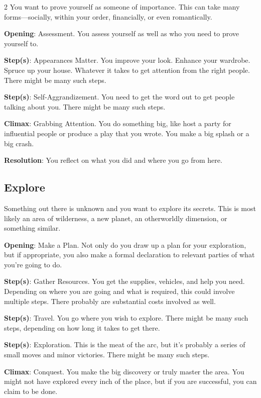 \begin{multicols}{2}
You want to prove yourself as someone of importance. This can take many forms—socially, within your order, financially, or even romantically.

\textbf{Opening}: Assessment. You assess yourself as well as who you need to prove yourself to.

\textbf{Step(s)}: Appearances Matter. You improve your look. Enhance your wardrobe. Spruce up your house. Whatever it takes to get attention from the right people. There might be many such steps.

\textbf{Step(s)}: Self-Aggrandizement. You need to get the word out to get people talking about you. There might be many such steps.

\textbf{Climax}: Grabbing Attention. You do something big, like host a party for influential people or produce a play that you wrote. You make a big splash or a big crash. 

\textbf{Resolution}: You reflect on what you did and where you go from here.

\subsection{Explore}

Something out there is unknown and you want to explore its secrets. This is most likely an area of wilderness, a new planet, an otherworldly dimension, or something similar.

\textbf{Opening}: Make a Plan. Not only do you draw up a plan for your exploration, but if appropriate, you also make a formal declaration to relevant parties of what you’re going to do.

\textbf{Step(s)}: Gather Resources. You get the supplies, vehicles, and help you need. Depending on where you are going and what is required, this could involve multiple steps. There probably are substantial costs involved as well.

\textbf{Step(s)}: Travel. You go where you wish to explore. There might be many such steps, depending on how long it takes to get there.

\textbf{Step(s)}: Exploration. This is the meat of the arc, but it’s probably a series of small moves and minor victories. There might be many such steps.

\textbf{Climax}: Conquest. You make the big discovery or truly master the area. You might not have explored every inch of the place, but if you are successful, you can claim to be done. 


\end{multicols}
